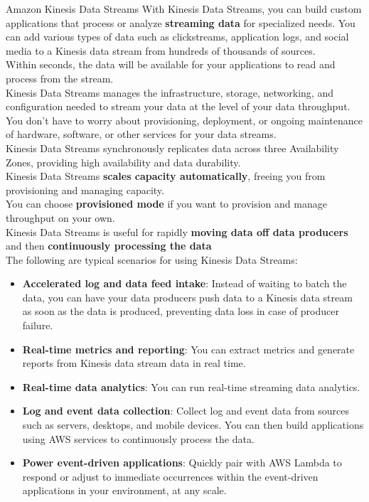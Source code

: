 \documentclass[12pt, letterpaper, twoside]{article}
\begin{document}
{Amazon Kinesis Data Streams}
With Kinesis Data Streams, you can build custom applications that process or analyze \textbf{streaming data} for specialized needs. 
You can add various types of data such as clickstreams, application logs, and social media to a Kinesis data stream from hundreds 
of thousands of sources.\\
Within seconds, the data will be available for your applications to read and process from the stream.\\

Kinesis Data Streams manages the infrastructure, storage, networking, and configuration needed to stream your data at the level of 
your data throughput. You don't have to worry about provisioning, deployment, or ongoing maintenance of hardware, software, or other 
services for your data streams.\\
Kinesis Data Streams synchronously replicates data across three Availability Zones, providing high availability and data durability.\\
Kinesis Data Streams \textbf{scales capacity automatically}, freeing you from provisioning and managing capacity.\\
You can choose \textbf{provisioned mode} if you want to provision and manage throughput on your own.\\

Kinesis Data Streams is useful for rapidly \textbf{moving data off data producers} and then \textbf{continuously processing the data}\\
The following are typical scenarios for using Kinesis Data Streams:
\begin{itemize}
	\item \textbf{Accelerated log and data feed intake}: Instead of waiting to batch the data, you can have your data producers push data 
		to a Kinesis data stream as soon as the data is produced, preventing data loss in case of producer failure.
	\item \textbf{Real-time metrics and reporting}: You can extract metrics and generate reports from Kinesis data stream data in real time.
	\item \textbf{Real-time data analytics}: You can run real-time streaming data analytics.
	\item \textbf{Log and event data collection}: Collect log and event data from sources such as servers, desktops, and mobile devices. 
		You can then build applications using AWS services to continuously process the data.
	\item \textbf{Power event-driven applications}: Quickly pair with AWS Lambda to respond or adjust to immediate occurrences within the 
		event-driven applications in your environment, at any scale.
\end{itemize}
\end{document}
